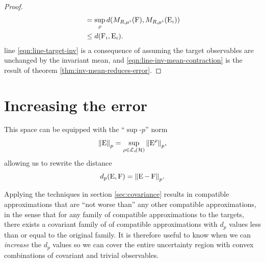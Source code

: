 \begin{thm}
\begin{proof}
\begin{align}
      \label{eqn:line-target-inv}
                                           &= \sup_\rho d(M_{R, \mu^i}(\operatorname{F}),  M_{R, \mu^i}(\operatorname{E}_i))\\
      \label{eqn:line-inv-mean-contraction}
                                           &\leq d(\operatorname{F}_i, \operatorname{E}_i).
    \end{align}
    line \eqref{eqn:line-target-inv} is a consequence of assuming the target observables are unchanged by the invariant mean, and \eqref{eqn:line-inv-mean-contraction} is the result of theorem \ref{thm:inv-mean-reduces-error}.
  \end{proof}
\end{thm}

\section{Increasing the error}
\label{sec:inc-error}

This space can be equipped with the ``$\sup$-$p$'' norm
\begin{equation}
  \pnorm{\ope} =  \sup_{\rho\in\saops[\hcal]} \pnorm{\ope^\rho},
\end{equation}
allowing us to rewrite the distance
\begin{align}
  d_p(\ope, \opf) = \pnorm{\ope - \opf}.
\end{align}

Applying the techniques in section \ref{sec:covariance} results in compatible approximations that are ``not worse than'' any other compatible approximations, in the sense that for any family of compatible approximations to the targets, there exists a covariant family of of compatible approximations with $d_p$ values less than or equal to the original family. It is therefore useful to know when we can \emph{increase} the $d_p$ values so we can cover the entire uncertainty region with convex combinations of covariant and trivial observables.

